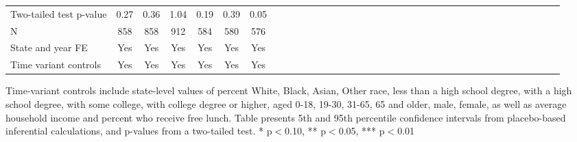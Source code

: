 \begin{table}[htbp]
\begin{center}
\begin{threeparttable}
\begin{tabular}{l*{6}{c c c c c c}}
Two-tailed test p-value&     \cellcolor[cmyk]{0.2,0,0,0}     0.27   &     \cellcolor[cmyk]{0.2,0,0,0}     0.36   &     \cellcolor[cmyk]{0.2,0,0,0}     1.04   &        0.19   &        0.39   &        0.05   \\
N                   &         858   &         858   &         912   &         584   &         580   &         576   \\
\midrule
State and year FE                              & Yes   & Yes   & Yes   & Yes   & Yes   & Yes            \\
Time variant controls                  & Yes   & Yes   & Yes   & Yes   & Yes   & Yes            \\
\bottomrule
\end{tabular}
\begin{tablenotes}
\tiny
\item Time-variant controls include state-level values of percent White, Black, Asian, Other race, less than a high school degree, with a high school degree, with some college, with college degree or higher, aged 0-18, 19-30, 31-65, 65 and older, male, female, as well as average household income and percent who receive free lunch.  Table presents 5th and 95th percentile confidence intervals from placebo-based inferential calculations, and p-values from a two-tailed test. * p$<$0.10, ** p$<$0.05, *** p$<$0.01
\end{tablenotes}
\end{threeparttable}
\end{center}
\end{table}
